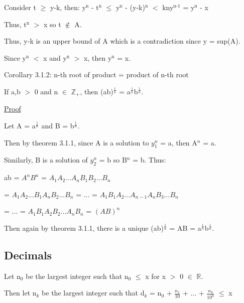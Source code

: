 	\qquad Consider t $ \geq $  y-k, then:
	y$^\text{n}$ - t$^\text{n}$ $ \leq $  y$^\text{n}$ - (y-k)$^\text{n}$ $<$
	kny$^\text{n-1}$ = y$^\text{n}$ - x

	\qquad Thus, t$^\text{n}$ $>$ x so t $\not \in$ A.

	\qquad Thus, y-k is an upper bound of A which is a contradiction since y = sup(A).

	Since y$^\text{n}$ $<$ x and y$^\text{n}$ $>$ x, then y$^\text{n}$ = x. 

\newpage

{ \color{orange} Corollary 3.1.2: n-th root of product = product of n-th root} 

	\begin{adjustbox}{minipage=14cm, right, vspace=0.1cm 0cm}
		If a,b $>$ 0 and n $\in$ $\mathbb{Z}_+$, then
		(ab)$^{\frac{1}{n}}$ = a$^{\frac{1}{n}}$b$^{\frac{1}{n}}$.  
	\end{adjustbox}

{ \color{magenta} \underline{Proof} } 

	Let A = a$^{\frac{1}{n}}$ and B = b$^{\frac{1}{n}}$.

	Then by {\color{red} theorem 3.1.1}, since A is a solution to $y_1^n$ = a, then A$^n$ = a.

	Similarly, B is a solution of $y_2^n$ = b so B$^n$ = b. Thus:

	\hspace{1cm} ab = $A^n$$B^n$ = $A_1A_2...A_nB_1B_2...B_n$

	\hspace{1.6cm} = $A_1A_2...B_1A_nB_2...B_n$ = ... = $A_1B_1A_2...A_{n-1}A_nB_3...B_n$

	\hspace{1.6cm} = ... = $A_1B_1A_2B_2...A_nB_n$ = $(AB)^n$

	Then again by {\color{red} theorem 3.1.1}, there is a unique
	(ab)$^{\frac{1}{n}}$ = AB = a$^{\frac{1}{n}}$b$^{\frac{1}{n}}$.




	
\subsection{Decimals}

	Let n$_0$ be the largest integer such that n$_0$ $\leq$ x for x $>$ 0 $\in$ $\mathbb{R}$.

	Then let n$_k$ be the largest integer such that
	d$_k$ = n$_0$ + $\frac{n_1}{10}$ + ... + $\frac{n_k}{10^k}$ $\leq$ x

